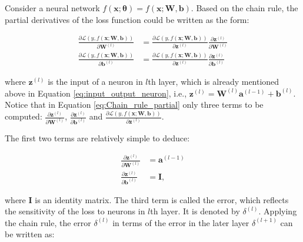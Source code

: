 \documentclass[
	parskip, 			   %
	twoside, 			   %
	DIV=14, 			   %
	BCOR=15.0mm, 		   %
	headsepline, 		   %
	open=right, 		   %
	captions=tableheading, %
	bibliography=totoc,    %
	numbers=noenddot       %
]{scrreprt}
\begin{document}
Consider a neural network $f(\mathbf{x};\mathbf{\theta})=f(\mathbf{x};\mathbf{W},\mathbf{b})$. Based on the chain rule, the partial derivatives of the loss function could be written as the form:

\begin{equation}
    \label{eq:Chain_rule_partial}
    \begin{aligned}
        \frac{\partial \mathcal{L}\left( y,f(\mathbf{x};\mathbf{\mathbf{W},\mathbf{b}}) \right)}{\partial \mathbf{W}^{(l)}} &= \frac{\partial \mathcal{L}\left( y,f(\mathbf{x};\mathbf{\mathbf{W},\mathbf{b}}) \right)}{\partial \mathbf{z}^{(l)}} 
        \frac{\partial \mathbf{z}^{(l)}}{\partial \mathbf{W}^{(l)}}
        \\
        \frac{\partial \mathcal{L}\left( y,f(\mathbf{x};\mathbf{\mathbf{W},\mathbf{b}}) \right)}{\partial \mathbf{b}^{(l)}} &= \frac{\partial \mathcal{L}\left( y,f(\mathbf{x};\mathbf{\mathbf{W},\mathbf{b}}) \right)}{\partial \mathbf{z}^{(l)}}
        \frac{\partial \mathbf{z}^{(l)}}{\partial \mathbf{b}^{(l)}}
    \end{aligned}
\end{equation}

where $\mathbf{z}^{(l)}$ is the input of a neuron in $l$th layer, which is already mentioned above in Equation \ref{eq:input_output_neuron}, i.e., $\mathbf{z}^{(l)} = \mathbf{W}^{(l)} \mathbf{a}^{(l-1)} + \mathbf{b}^{(l)}$. Notice that in Equation \ref{eq:Chain_rule_partial} only three terms to be computed: $\frac{\partial \mathbf{z}^{(l)}}{\partial \mathbf{W}^{(l)}}$, $\frac{\partial \mathbf{z}^{(l)}}{\partial \mathbf{b}^{(l)}}$ and $\frac{\partial \mathcal{L}\left( y,f(\mathbf{x};\mathbf{\mathbf{W},\mathbf{b}}) \right)}{\partial \mathbf{z}^{(l)}}$.

The first two terms are relatively simple to deduce:

\begin{equation}
    \label{eq:two_terms}
    \begin{aligned}
        \frac{\partial \mathbf{z}^{(l)}}{\partial \mathbf{W}^{(l)}} &= \mathbf{a}^{(l-1)}
        \\
        \frac{\partial \mathbf{z}^{(l)}}{\partial \mathbf{b}^{(l)}} &= \mathbf{I},
    \end{aligned}
\end{equation}

where $\mathbf{I}$ is an identity matrix. The third term is called the error, which reflects the sensitivity of the loss to neurons in $l$th layer. It is denoted by $\delta^{(l)}$. Applying the chain rule, the error $\delta^{(l)}$ in terms of the error in the
later layer $\delta^{(l+1)}$ can be written as:
\end{document}
